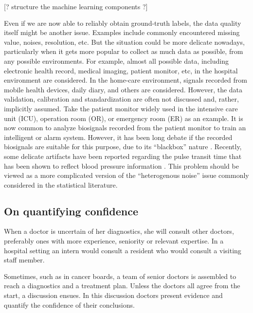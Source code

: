 \documentclass[fleqn,10pt]{wlscirep}
\begin{document}
{\color{blue}
[? structure the machine learning components ?]

Even if we are now able to reliably obtain ground-truth labels, the data quality itself might be another issue. Examples include commonly encountered missing value, noises, resolution, etc. But the situation could be more delicate nowadays, particularly when it gets more popular to collect as much data as possible, from any possible environments. For example, almost all possible data, including electronic health record, medical imaging, patient monitor, etc, in the hospital environment are considered. In the home-care environment, signals recorded from mobile health devices, daily diary, and others are considered. However, the data validation, calibration and standardization are often not discussed and, rather, implicitly assumed. Take the patient monitor widely used in the intensive care unit (ICU), operation room (OR), or emergency room (ER) as an example. It is now common to analyze biosignals recorded from the patient monitor to train an intelligent \cite{Johnson2016} or alarm \cite{fleischman2019emergency} system. However, it has been long debate if the recorded biosignals are suitable for this purpose, due to its ``blackbox'' nature \cite{Feldman2006,Shelley2016,Cannesson2016}. Recently, some delicate artifacts have been reported \cite{lin2019unexpected} regarding the pulse transit time that has been shown to reflect blood pressure information \cite{gesche2012continuous}. This problem should be viewed as a more complicated version of the ``heterogenous noise'' issue commonly considered in the statistical literature.
}






\subsection*{On quantifying confidence}

When a doctor is uncertain of her diagnostics, she  will consult other doctors, preferably ones with more experience, seniority or relevant expertise. In a hospital setting an intern would consult a resident who would consult a visiting staff member.

Sometimes, such as in cancer boards, a team of senior doctors is assembled to reach a diagnostics and a treatment plan. 
Unless the doctors all agree from the start, a discussion ensues. In this discussion doctors present evidence and quantify the confidence of their conclusions.
\end{document}
